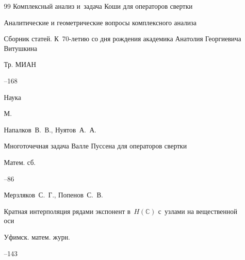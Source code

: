 \begin{thebibliography}{99}
\paper Комплексный анализ и~задача Коши для операторов свертки

\inbook Аналитические и геометрические вопросы комплексного анализа

\bookinfo Сборник статей. К~70-летию со дня рождения академика Анатолия Георгиевича Витушкина

\serial Тр. МИАН



--168

\publ Наука

\publaddr М.







\by Напалков~В.~В., Нуятов~А.~А.

\paper Многоточечная задача Валле Пуссена для операторов свертки

\jour Матем. сб.




--86









\by Мерзляков~С.~Г., Попенов~С.~В.

\paper Кратная интерполяция рядами экспонент в~$H(\mathbb C)$ с~узлами на вещественной оси

\jour Уфимск. матем. журн.




--143





\end{thebibliography}
